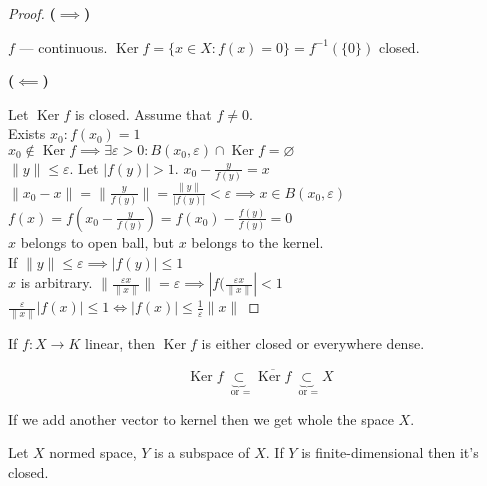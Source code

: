  \begin{proof}
   \textbf{($\implies$)}

   $f$ --- continuous. $\operatorname{Ker} f = \{x \in  X: f(x) = 0\} = f^{-1} (\{0\} ) $ closed.

   \textbf{($\impliedby$)}

   Let $\operatorname{Ker}f$ is closed. Assume that $f \neq  0$.\\
   Exists $x_0: f(x_0) = 1$ \\
   $x_0 \not\in  \operatorname{Ker} f \implies \exists \varepsilon>0: B(x_0, \varepsilon) \cap \operatorname{Ker}f = \varnothing$\\
   $\|y\| \le  \varepsilon$. Let $\left| f(y) \right| > 1$. $x_0 - \frac{y}{f(y)} = x$ \\
 $\|x_0 - x\| = \|\frac{y}{f(y)}\| = \frac{\|y\|}{\left| f(y) \right|} < \varepsilon \implies x \in  B(x_0, \varepsilon)$ \\
   $f(x) = f(x_0 - \frac{y}{f(y)}) = f(x_0) - \frac{f(y)}{f(y)} = 0$ \\
   $x$ belongs to open ball, but $x$ belongs to the kernel.\\
   If $\|y\| \le \varepsilon \implies \left| f(y) \right|  \le 1$\\
   $x$ is arbitrary. $\|\frac{\varepsilon x}{\|x\|}\| = \varepsilon \implies \left| f(\frac{\varepsilon x}{\|x\|} \right| < 1$\\
   $\frac{\varepsilon}{\|x\|} \left| f(x) \right| \le 1 \iff \left| f(x) \right| \le \frac{1}{\varepsilon} \|x\|$
 \end{proof}

 \begin{notice}
   If $f: X \to K$ linear, then $\operatorname{Ker} f$ is either closed or everywhere dense.

   \[ \operatorname{Ker}f \underbrace{\subset}_{ \text{ or } =} \overline{\operatorname{Ker} f} \underbrace{\subset}_{ \text{ or } =} X  \] 

   If we add another vector to kernel then we get whole the space $X$. 
 \end{notice}

 \begin{theorem}
   Let $X$ normed space,  $Y$ is a subspace of $X$. If  $Y$ is finite-dimensional then it's closed.
 \end{theorem}

